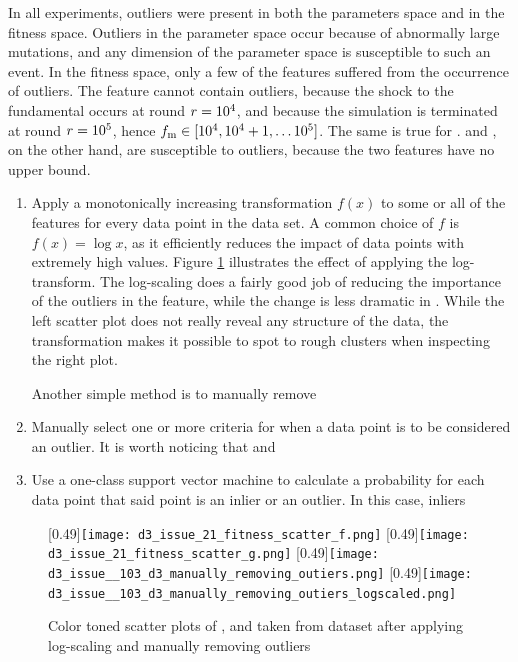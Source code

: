 In all experiments, outliers were present in both the parameters space and in the fitness space. Outliers in the parameter space occur because of abnormally large mutations, and any dimension of the parameter space is susceptible to such an event. In the fitness space, only a few of the features suffered from the occurrence of outliers. The feature \roundstable cannot contain outliers, because the shock to the fundamental occurs at round $r = 10^4$, and because the simulation is terminated at round $r = 10^5$, hence $f_\text{m} \in [10^4,10^4+1,\hdots 10^5]$. The same is true for \timetoreachnewfundamental. \stdev and \overshoot, on the other hand, are susceptible to outliers, because the two features have no upper bound.


\begin{enumerate}
\item Apply a monotonically increasing transformation $f(x)$ to some or all of the features for every data point in the data set. A common choice of $f$ is $f(x) = \log x$, as it efficiently reduces the impact of data points with extremely high values. Figure \ref{figure:scatter_log_transform} illustrates the effect of applying the log-transform. The log-scaling does a fairly good job of reducing the importance of the outliers in the \stdev feature, while the change is less dramatic in \timetoreachnewfundamental. While the left scatter plot does not really reveal any structure of the data, the transformation makes it possible to spot to rough clusters when inspecting the right plot.

Another simple method is to manually remove 
\item Manually select one or more criteria for when a data point is to be considered an outlier. It is worth noticing that \overshoot and \stdev 
\item Use a one-class support vector machine to calculate a probability for each data point that said point is an inlier or an outlier. In this case, inliers 
\end{enumerate}

\begin{figure}\label{figure:scatter_log_transform}
[0.49\linewidth]{\texttt{[image: d3\_issue\_21\_fitness\_scatter\_f.png]}}
[0.49\linewidth]{\texttt{[image: d3\_issue\_21\_fitness\_scatter\_g.png]}}
[0.49\linewidth]{\texttt{[image: d3\_issue\_\_103\_d3\_manually\_removing\_outiers.png]}}
[0.49\linewidth]{\texttt{[image: d3\_issue\_\_103\_d3\_manually\_removing\_outiers\_logscaled.png]}}
\caption{Color toned scatter plots of \timetoreachnewfundamental, \stdev and \roundstable taken from dataset \dthree after applying log-scaling and manually removing outliers}
\end{figure}


